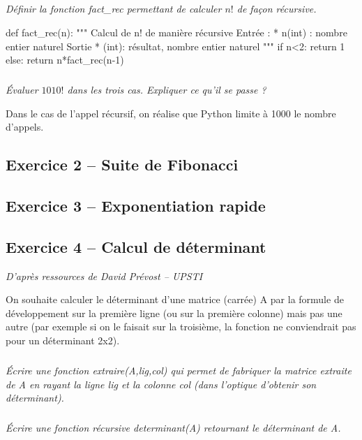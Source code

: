 \documentclass[10pt,fleqn]{article} %
\begin{document}
\begin{multicols}{2}
\subparagraph{}
\textit{Définir la fonction \textsf{fact\_rec} permettant de calculer $n!$ de façon récursive.}
\ifprof
\begin{corrige}
\begin{python}
def fact_rec(n):
    """
    Calcul de n! de manière récursive
    Entrée : 
     * n(int) : nombre entier naturel
    Sortie 
     * (int): résultat, nombre entier naturel
    """
    if n<2:
        return 1
    else:
        return n*fact_rec(n-1)
\end{python}
\end{corrige}
\else
\fi


\subparagraph{}
\textit{Évaluer $1010!$ dans les trois cas. Expliquer ce qu'il se passe ?}
\ifprof
\begin{corrige}
Dans le cas de l'appel récursif, on réalise que Python limite à 1000 le nombre d'appels. 
\end{corrige}
\else
\fi

\subsection*{Exercice 2 -- Suite de Fibonacci}
\setcounter{subparagraph}{0}

\subsection*{Exercice 3 -- Exponentiation rapide}
\setcounter{subparagraph}{0}

\subsection*{Exercice 4 -- Calcul de déterminant}
\setcounter{subparagraph}{0}

\textit{D'après ressources de David Prévost -- UPSTI}

On souhaite calculer le déterminant d’une matrice (carrée) A par la formule de développement
sur la première ligne (ou sur la première colonne) mais pas une autre (par exemple si on le
faisait sur la troisième, la fonction ne conviendrait pas pour un déterminant 2x2).
\subparagraph{}
\textit{Écrire une fonction \textsl{extraire(A,lig,col)} qui permet de fabriquer la matrice
extraite de \textsl{A} en rayant la ligne \textsl{lig} et la colonne \textsl{col} (dans l’optique d’obtenir son
déterminant).}

\subparagraph{}
\textit{Écrire une fonction récursive \textsl{determinant(A)} retournant le déterminant de \textsl{A}.}


\end{multicols}
\end{document}
